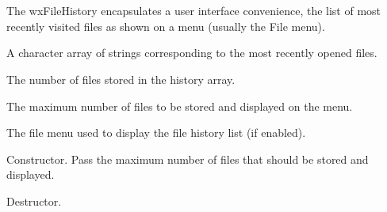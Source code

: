 \section{}\label{wxfilehistory}

The wxFileHistory encapsulates a user interface convenience, the
list of most recently visited files as shown on a menu (usually the File menu).








A character array of strings corresponding to the most recently opened
files.



The number of files stored in the history array.



The maximum number of files to be stored and displayed on the menu.



The file menu used to display the file history list (if enabled).



Constructor. Pass the maximum number of files that should be stored and displayed.



Destructor.



